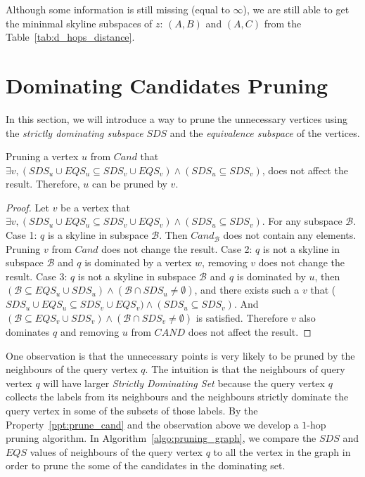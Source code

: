 Although some information is still missing (equal to $\infty$), we are still able to get the mininmal skyline subspaces of $z$: $(A, B)$ and $(A, C)$ from the Table~\ref{tab:d_hops_distance}.

\section{Dominating Candidates Pruning}

In this section, we will introduce a way to prune the unnecessary vertices using the \emph{strictly dominating subspace} $SDS$ and the \emph{equivalence subspace} of the vertices.

\begin{property}
\label{ppt:prune_cand}
Pruning a vertex $u$ from $Cand$ that $\exists v, (SDS_u \cup EQS_u \subseteq SDS_v \cup EQS_v) \wedge (SDS_u \subseteq SDS_v)$, does not affect the result. Therefore, $u$ can be pruned by $v$.
\end{property}

\begin{proof}
Let $v$ be a vertex that $\exists v, (SDS_u \cup EQS_u \subseteq SDS_v \cup EQS_v) \wedge (SDS_u \subseteq SDS_v)$. For any subspace $\mathcal{B}$. Case 1: $q$ is a skyline in subspace $\mathcal{B}$. Then $Cand_\mathcal{B}$ does not contain any elements. Pruning $v$ from $Cand$ does not change the result.
Case 2: $q$ is not a skyline in subspace $\mathcal{B}$ and $q$ is dominated by a vertex $w$, removing $v$ does not change the result. Case 3: $q$ is not a skyline in subspace $\mathcal{B}$ and $q$ is dominated by $u$, then $(\mathcal{B} \subseteq EQS_u \cup SDS_u) \wedge (\mathcal{B} \cap SDS_u \not= \emptyset)$, and there exists such a $v$ that ($SDS_u \cup EQS_u \subseteq SDS_v \cup EQS_v) \wedge (SDS_u \subseteq SDS_v)$. And $(\mathcal{B} \subseteq EQS_v \cup SDS_v) \wedge (\mathcal{B} \cap SDS_v \not= \emptyset)$ is satisfied. Therefore $v$ also dominates $q$ and removing $u$ from $CAND$ does not affect the result.
\end{proof}

One observation is that the unnecessary points is very likely to be pruned by the neighbours of the query vertex $q$. The intuition is that the neighbours of query vertex $q$ will have larger \emph{Strictly Dominating Set} because the query vertex $q$ collects the labels from its neighbours and the neighbours strictly dominate the query vertex in some of the subsets of those labels.
By the Property~\ref{ppt:prune_cand} and the observation above we develop a $1$-hop pruning algorithm. In Algorithm~\ref{algo:pruning_graph}, we compare the $\mathit{SDS}$ and $\mathit{EQS}$ values of neighbours of the query vertex $q$ to all the vertex in the graph in order to prune the some of the candidates in the dominating set.

